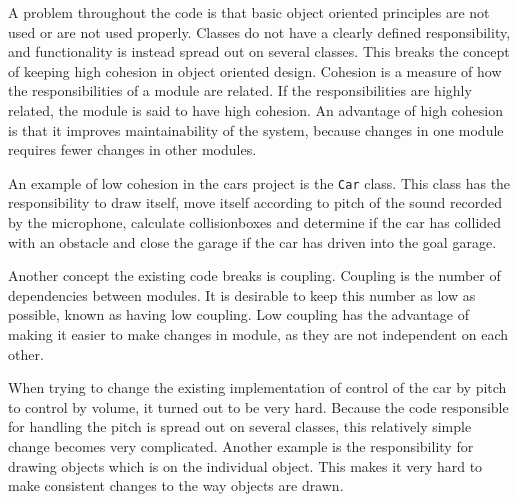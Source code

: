 A problem throughout the code is that basic object oriented principles are not used or are not used properly. 
Classes do not have a clearly defined responsibility, and functionality is instead spread out on several classes. 
This breaks the concept of keeping high cohesion in object oriented design. 
Cohesion is a measure of how the responsibilities of a module are related. 
If the responsibilities are highly related, the module is said to have high cohesion.
An advantage of high cohesion is that it improves maintainability of the system, because changes in one module requires fewer changes in other modules. 

An example of low cohesion in the cars project is the \lstinline!Car! class. 
This class has the responsibility to draw itself, move itself according to pitch of the sound recorded by the microphone, calculate collisionboxes and determine if the car has collided with an obstacle and close the garage if the car has driven into the goal garage.

Another concept the existing code breaks is coupling.
Coupling is the number of  dependencies between modules.
It is desirable to keep this number as low as possible, known as having low coupling.
Low coupling has the advantage of making it easier to make changes in module, as they are not independent on each other.

When trying to change the existing implementation of control of the car by pitch to control by volume, it turned out to be very hard.
Because the code responsible for handling the pitch is spread out on several classes, this relatively simple change becomes very complicated.
Another example is the responsibility for drawing objects which is on the individual object. 
This makes it very hard to make consistent changes to the way objects are drawn.
